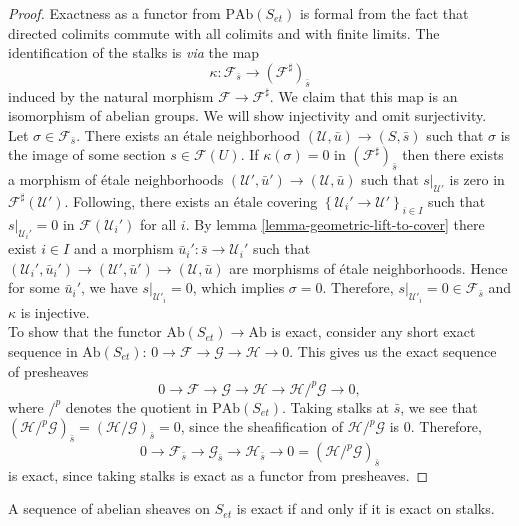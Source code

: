 \begin{proof}
Exactness as a functor from $\text{PAb}(S_{et})$ is formal from the fact that 
directed colimits commute with all colimits and with finite limits. The 
identification of the stalks is {\it via} the map
$$
\kappa : \mathcal{F}_{\bar s}\longrightarrow 
\left(\mathcal{F}^\sharp\right)_{\bar s}
$$
induced by the natural morphism $\mathcal{F}\to \mathcal{F}^\sharp$.  We claim 
that this map is an isomorphism of abelian groups.  We will show injectivity 
and omit surjectivity. 
\\
Let $\sigma\in \mathcal{F}_{\bar s}$. There exists an \'etale neighborhood 
$(\mathcal{U}, \bar u)\to (S, \bar s)$ such that $\sigma$ is the image of some 
section $s \in \mathcal{F}(U)$. If $\kappa(\sigma) = 0$ in 
$(\mathcal{F}^\sharp)_{\bar s}$ then there exists a morphism of \'etale 
neighborhoods $(\mathcal{U}', \bar u')\to (\mathcal{U}, \bar u)$ such that 
$s|_{\mathcal{U}'}$ is zero in $\mathcal{F}^\sharp(\mathcal{U}')$. Following, 
there exists an \'etale covering $\left\{\mathcal{U}_i'\to 
\mathcal{U}'\right\}_{i\in I}$ such that $s|_{\mathcal{U}_i'}=0$ in 
$\mathcal{F}(\mathcal{U}_i')$ for all $i$. By lemma 
\ref{lemma-geometric-lift-to-cover} there exist  $i \in I$ and a morphism $\bar 
u_i': \bar s \to \mathcal{U}_i'$ such that  $(\mathcal{U}_i', \bar u_i')\to 
(\mathcal{U}', \bar u')\to (\mathcal{U}, \bar u)$ are morphisms of \'etale 
neighborhoods. Hence for some $\bar u_i'$, we have $s|_{\mathcal{U}'_i}=0$, 
which implies $\sigma = 0$.  Therefore, $s|_{\mathcal{U}'_i} = 0 \in 
\mathcal{F}_{\bar s}$ and $\kappa$ is injective.
\\
To show that the functor $\text{Ab}(S_{et}) \to \text{Ab}$ is exact, consider 
any short exact sequence in $\text{Ab}(S_{et})$:
$
0\to \mathcal{F}\to \mathcal{G}\to \mathcal H \to 0.
$
This gives us the  exact sequence of presheaves
$$
0 \to \mathcal{F}\to \mathcal{G} \to \mathcal H\to \mathcal H/^p\mathcal{G} \to 
0,
$$
where $/^p$ denotes the quotient in $\text{PAb}(S_{et})$. Taking stalks at 
$\bar s$, we see that $(\mathcal H /^p\mathcal{G})_{\bar{s}} = (\mathcal H 
/\mathcal{G})_{\bar{s}} = 0$, since the sheafification of $\mathcal 
H/^p\mathcal{G}$ is $0$. 
Therefore, 
$$
0\to \mathcal{F}_{\bar s	} \to \mathcal{G}_{\bar s} \to 
\mathcal{H}_{\bar s} \to 0 = (\mathcal H/^p\mathcal{G})_{\bar s}
$$
is exact, since taking stalks is exact as a functor from presheaves.
\end{proof}

\begin{theorem}
\label{theorem-exactness-stalks}
A sequence of abelian sheaves on
$S_{et}$ is exact if and only if it is exact on stalks.  
\end{theorem}

